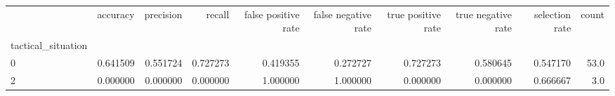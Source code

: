 \begin{tabular}{lrrrrrrrrr}
\toprule
{} &  accuracy &  precision &    recall &  false positive rate &  false negative rate &  true positive rate &  true negative rate &  selection rate &  count \\
tactical\_situation &           &            &           &                      &                      &                     &                     &                 &        \\
\midrule
0                  &  0.641509 &   0.551724 &  0.727273 &             0.419355 &             0.272727 &            0.727273 &            0.580645 &        0.547170 &   53.0 \\
2                  &  0.000000 &   0.000000 &  0.000000 &             1.000000 &             1.000000 &            0.000000 &            0.000000 &        0.666667 &    3.0 \\
\bottomrule
\end{tabular}
